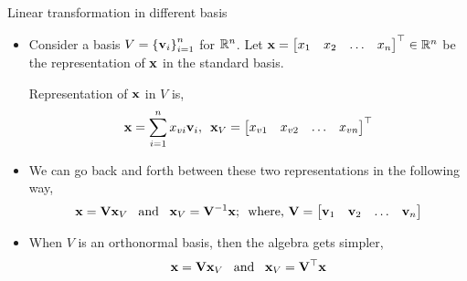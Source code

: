 \documentclass[aspectratio=169]{beamer}
\let\olditem\item
\renewcommand{\item}{\setlength{\itemsep}{\fill}\olditem}
\def\mf{\ensuremath\mathbf}
\def\mb{\ensuremath\mathbb}
\begin{document}
\begin{frame}[t]{Linear transformation in different basis}
\begin{itemize}
    \item Consider a basis $V=\left\{\mf{v}_i\right\}_{i=1}^{n}$ for $\mb{R}^n$. Let $\mf{x} = \begin{bmatrix*}x_1 & x_2 & \ldots & x_n\end{bmatrix*}^\top \in \mb{R}^n$ be the representation of $\mf{x}$ in 
    the standard basis.
    
    Representation of $\mf{x}$ in $V$ is,
    \[ \mf{x} = \sum_{i=1}^n x_{vi}\mf{v}_i, \,\,\, \mf{x}_V = \begin{bmatrix*}x_{v1} & x_{v2} & \ldots & x_{vn}\end{bmatrix*}^\top \]

    \item We can go back and forth between these two representations in the following way,
    \[ \mf{x} = \mf{V}\mf{x}_V \,\,\, \text{ and } \,\,\, \mf{x}_V = \mf{V}^{-1}\mf{x}; \,\,\, \text{where, } \mf{V} = \begin{bmatrix*}\mf{v}_1 & \mf{v}_2 & \ldots & \mf{v}_n\end{bmatrix*} \]

    \item When $V$ is an orthonormal basis, then the algebra gets simpler,
    \[ \mf{x} = \mf{V}\mf{x}_V \,\,\, \text{ and } \,\,\, \mf{x}_V = \mf{V}^\top\mf{x} \]

\end{itemize}
\end{frame}
\end{document}
